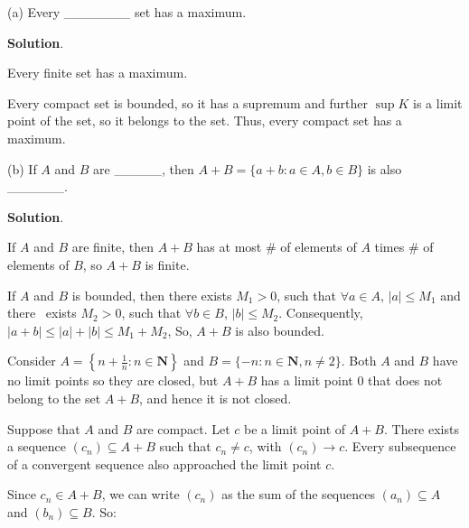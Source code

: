 \documentclass[10pt]{article}
\begin{document}
(a) Every \_\_\_\_\_\_\_ set has a maximum.



\textbf{Solution}. 



Every finite set has a maximum. 



Every compact set is bounded, so it has a supremum and further $\displaystyle \sup K$ is a limit point of the set, so it belongs to the set. Thus, every compact set has a maximum.



(b) If $\displaystyle A$ and $\displaystyle B$ are \_\_\_\_\_, then $\displaystyle A+B=\{a+b:a\in A,b\in B\}$ is also \_\_\_\_\_\_.



\textbf{Solution}.



If $\displaystyle A$ and $\displaystyle B$ are finite, then $\displaystyle A+B$ has at most \# of elements of $\displaystyle A$ times \# of elements of $\displaystyle B$, so $\displaystyle A+B$ is finite.



If $\displaystyle A$ and $\displaystyle B$ is bounded, then there exists $\displaystyle M_{1}  >0$, such that $\displaystyle \forall a\in A$, $\displaystyle |a|\leq M_{1}$ and there \ exists $\displaystyle M_{2}  >0$, such that $\displaystyle \forall b\in B$, $\displaystyle |b|\leq M_{2}$. Consequently, $\displaystyle |a+b|\leq |a|+|b|\leq M_{1} +M_{2}$, So, $\displaystyle A+B$ is also bounded.



Consider $\displaystyle A=\left\{n+\frac{1}{n} :n\in \mathbf{N}\right\}$ and $\displaystyle B=\{-n:n\in \mathbf{N} ,n\neq 2\}$. Both $\displaystyle A$ and $\displaystyle B$ have no limit points so they are closed, but $\displaystyle A+B$ has a limit point $\displaystyle 0$ that does not belong to the set $\displaystyle A+B$, and hence it is not closed.



Suppose that $\displaystyle A$ and $\displaystyle B$ are compact. Let $\displaystyle c$ be a limit point of $\displaystyle A+B$. There exists a sequence $\displaystyle ( c_{n}) \subseteq A+B$ such that $\displaystyle c_{n} \neq c$, with $\displaystyle ( c_{n})\rightarrow c$. Every subsequence of a convergent sequence also approached the limit point $\displaystyle c$. 



 Since $\displaystyle c_{n} \in A+B$, we can write $\displaystyle ( c_{n})$ as the sum of the sequences $\displaystyle ( a_{n}) \subseteq A$ and $\displaystyle ( b_{n}) \subseteq B$. So:
\end{document}

